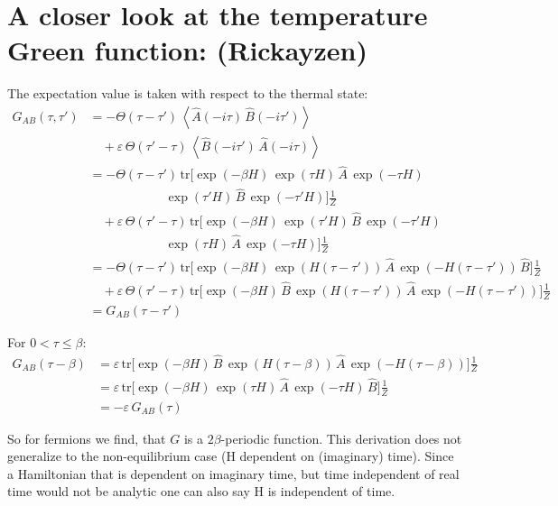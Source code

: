 \section{A closer look at the temperature Green function: (Rickayzen\cite{rickayzen_green_1980})}

The expectation value is taken with respect to the thermal state:
\begin{align*}
    G_{AB}(\tau,\tau') &= -\Theta(\tau-\tau')\, \left\langle \hat{A}(-i\tau)\, \hat{B}(-i\tau') \right\rangle \\
    &\quad + \varepsilon\, \Theta(\tau'-\tau)\, \left\langle \hat{B}(-i\tau')\, \hat{A}(-i\tau) \right\rangle \\[1ex]
    &= -\Theta(\tau-\tau')\, \mathrm{tr}\Big[ \exp(-\beta H)\, \exp(\tau H)\, \hat{A}\, \exp(-\tau H) \\
    &\qquad\qquad\qquad \exp(\tau' H)\, \hat{B}\, \exp(-\tau' H) \Big] \frac{1}{Z} \\
    &\quad + \varepsilon\, \Theta(\tau'-\tau)\, \mathrm{tr}\Big[ \exp(-\beta H)\, \exp(\tau' H)\, \hat{B}\, \exp(-\tau' H) \\
    &\qquad\qquad\qquad \exp(\tau H)\, \hat{A}\, \exp(-\tau H) \Big] \frac{1}{Z} \\[1ex]
    &= -\Theta(\tau-\tau')\, \mathrm{tr}\Big[ \exp(-\beta H)\, \exp(H(\tau-\tau'))\, \hat{A}\, \exp(-H(\tau-\tau'))\, \hat{B} \Big] \frac{1}{Z} \\
    &\quad + \varepsilon\, \Theta(\tau'-\tau)\, \mathrm{tr}\Big[ \exp(-\beta H)\, \hat{B}\, \exp(H(\tau-\tau'))\, \hat{A}\, \exp(-H(\tau-\tau')) \Big] \frac{1}{Z} \\[1ex]
    &= G_{AB}(\tau-\tau')
\end{align*}

For $0 < \tau \leq \beta$:
\begin{align*}
    G_{AB}(\tau-\beta) &= \varepsilon\, \mathrm{tr}\Big[ \exp(-\beta H)\, \hat{B}\, \exp(H(\tau-\beta))\, \hat{A}\, \exp(-H(\tau-\beta)) \Big] \frac{1}{Z} \\
    &= \varepsilon\, \mathrm{tr}\Big[ \exp(-\beta H)\, \exp(\tau H)\, \hat{A}\, \exp(-\tau H)\, \hat{B} \Big] \frac{1}{Z} \\
    &= -\varepsilon\, G_{AB}(\tau)
\end{align*}

So for fermions we find, that $G$ is a $2\beta$-periodic function. This derivation does not generalize to the 
non-equilibrium case (H dependent on (imaginary) time). Since a Hamiltonian that is dependent on imaginary time, but
time independent of real time would not be analytic one can also say H is independent of time. 

